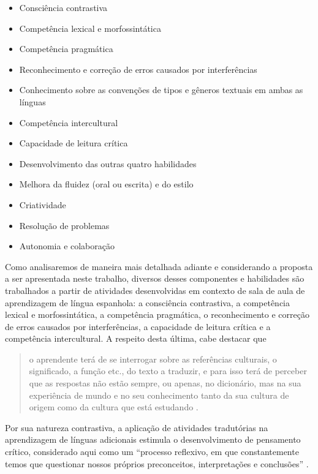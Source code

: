 \documentclass[portuguese]{textolivre}
\begin{document}
\begin{itemize}
\item Consciência contrastiva
\item Competência lexical e morfossintática
\item Competência pragmática
\item Reconhecimento e correção de erros causados por interferências
\item Conhecimento sobre as convenções de tipos e gêneros textuais em ambas as línguas
\item Competência intercultural
\item Capacidade de leitura crítica
\item Desenvolvimento das outras quatro habilidades
\item Melhora da fluidez (oral ou escrita) e do estilo
\item Criatividade
\item Resolução de problemas
\item Autonomia e colaboração
\end{itemize}

Como analisaremos de maneira mais detalhada adiante e considerando a proposta a ser apresentada neste trabalho, diversos desses componentes e habilidades são trabalhados a partir de atividades desenvolvidas em contexto de sala de aula de aprendizagem de língua espanhola: a consciência contrastiva, a competência lexical e morfossintática, a competência pragmática, o reconhecimento e correção de erros causados por interferências, a capacidade de leitura crítica e a competência intercultural. A respeito desta última, cabe destacar que

\begin{quote}
o aprendente terá de se interrogar sobre as referências culturais, o significado, a função etc., do texto a traduzir, e para isso terá de perceber que as respostas não estão sempre, ou apenas, no dicionário, mas na sua experiência de mundo e no seu conhecimento tanto da sua cultura de origem como da cultura que está estudando \cite[p. 64, tradução nossa]{mendo2009}.
\end{quote}

Por sua natureza contrastiva, a aplicação de atividades tradutórias na aprendizagem de línguas adicionais estimula o desenvolvimento de pensamento crítico, considerado aqui como um “processo reflexivo, em que constantemente temos que questionar nossos próprios preconceitos, interpretações e conclusões” \cite[p. 70]{buckingham2022}.
\end{document}
